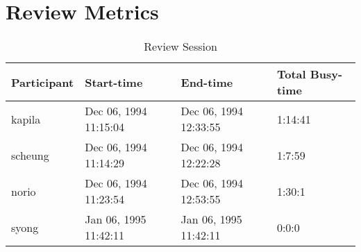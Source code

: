\section{Review Metrics}
\begin{table}[hb]
\begin{center}
\begin{tabular}{|l|l|l|l|}
\hline
Participant & Start-time & End-time & Total Busy-time \\
\hline
kapila & Dec 06, 1994 11:15:04 & Dec 06, 1994 12:33:55 & 1:14:41 \\
scheung & Dec 06, 1994 11:14:29 & Dec 06, 1994 12:22:28 & 1:7:59 \\
norio & Dec 06, 1994 11:23:54 & Dec 06, 1994 12:53:55 & 1:30:1 \\
syong & Jan 06, 1995 11:42:11 & Jan 06, 1995 11:42:11 & 0:0:0 \\
\hline
\end{tabular}
\end{center}
\caption{Review Session}
\end{table}


